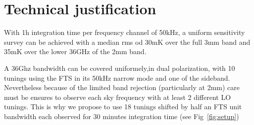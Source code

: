 \section{Technical justification}
With 1h integration time per frequency channel of 50kHz, a uniform sensitivity survey can be achieved with a median rms od 30mK over the full 3mm band and 35mK over the lower 36GHz of the 2mm band. 

A 36Ghz bandwidth can be covered uniformely,in dual polarization, with 10 tunings using the FTS in its 50kHz narrow mode and one of the sideband. Nevertheless because of the limited band rejection (particularly at 2mm) care must be ensures to observe each sky frequency with at least 2 different LO tunings. This is why we propose to use 18 tunings shifted by half an FTS unit bandwidth each observed for 30 minutes integration time (see Fig~\ref{fig:setup})
   
  
  
  
  
